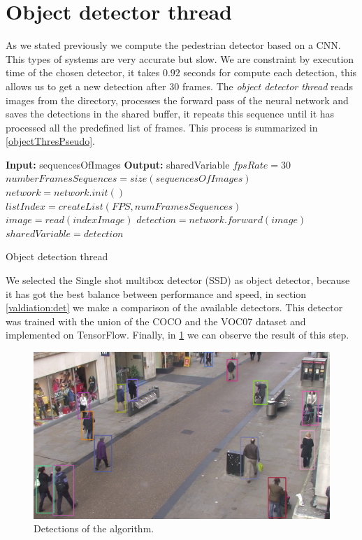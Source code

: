 \section{Object detector thread}



As we stated previously we compute the pedestrian detector based on a CNN. This types of systems are very accurate but slow. We are constraint by execution time of the chosen detector, it takes $0.92$ seconds for compute each detection, this allows us to get a new detection after $30$ frames. The \textit{object detector thread} reads images from the directory, processes the forward pass of the neural network and saves the detections in the shared buffer, it repeats this sequence until it has processed all the predefined list of frames. This process is summarized in \ref{objectThresPseudo}.


\begin{algorithm}
\begin{algorithmic}[1]
\State \textbf{Input:} sequencesOfImages
\State \textbf{Output:} sharedVariable
\State $fpsRate = 30$
\State $numberFramesSequences = size(sequencesOfImages)$
\State $network = network.init()$
\State $listIndex = createList(FPS,numFramesSequences)$
\State $image = read(indexImage)$
\State $detection = network.forward(image)$
\State $sharedVariable = detection$
\EndFor
\EndProcedure
\end{algorithmic}
\caption{Object detection thread}\label{objectThresPseudo}
\end{algorithm}

We selected the Single shot multibox detector (SSD) as object detector, because it has got the best balance between performance and speed, in section \ref{valdiation:det} we make a comparison of the available detectors. This detector was trained with the union of the COCO and the VOC07 dataset and implemented on TensorFlow. Finally, in \ref{objectDetector1} we can observe the result of this step.


\begin{figure}[H]
\centering         
\includegraphics[width=12cm]{intro/deteccions.jpg}
\caption{Detections of the algorithm.} \label{objectDetector1}
\end{figure}


